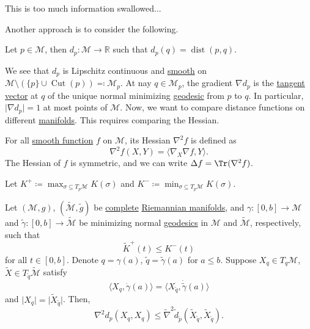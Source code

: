 \begin{note}
	This is too much information swallowed...
\end{note}

Another approach is to consider the following.

\begin{notation}
	Let \(p\in \mathcal{M} \), then \(d_p \colon \mathcal{M} \to \mathbb{R} \) such that \(d_p(q) = \mathop{\mathrm{dist}}(p, q) \).
\end{notation}

We see that \(d_p\) is Lipschitz continuous and \hyperref[def:smooth-function]{smooth} on \(\mathcal{M} \setminus (\{ p \} \cup \mathop{\mathrm{Cut}}(p) ) \eqqcolon \mathcal{M} _p\). At nay \(q\in \mathcal{M} _p\), the gradient \(\nabla d_p\) is the \hyperref[def:tangent-vector]{tangent vector} at \(q\) of the unique normal minimizing \hyperref[def:geodesic]{geodesic} from \(p\) to \(q\). In particular, \(\vert \nabla d_p \vert = 1\) at most points of \(\mathcal{M} \). Now, we want to compare distance functions on different \hyperref[def:smooth-manifold]{manifolds}. This requires comparing the Hessian.

\begin{prev}[Hessian]
	For all \hyperref[def:smooth-function]{smooth function} \(f\) on \(\mathcal{M} \), its Hessian \(\nabla ^2 f\) is defined as
	\[
		\nabla ^2 f(X, Y) = \langle \nabla _X \nabla f, Y \rangle.
	\]
	The Hessian of \(f\) is symmetric, and we can write \(\Delta f = \Tr (\nabla ^2 f)\).
\end{prev}

\begin{notation}
	Let \(K^+ \coloneqq \max _{\sigma \subseteq T_p \mathcal{M} } K(\sigma )\) and \(K^- \coloneqq \min _{\sigma \subseteq T_p \mathcal{M} } K(\sigma )\).
\end{notation}

\begin{theorem}\label{thm:comparsion-Hessian}
	Let \((\mathcal{M} , g)\), \((\widetilde{\mathcal{M}} , \widetilde{g} )\) be \hyperref[def:geodesically-complete]{complete} \hyperref[def:Riemannian-manifold]{Riemannian manifolds}, and \(\gamma \colon [0, b] \to \mathcal{M} \) and \(\widetilde{\gamma} \colon [0, b] \to \widetilde{\mathcal{M}} \) be minimizing normal \hyperref[def:geodesic]{geodesics} in \(\mathcal{M} \) and \(\widetilde{\mathcal{M}} \), respectively, such that
	\[
		\widetilde{K} ^+ (t)\leq K^-(t)
	\]
	for all \(t\in [0, b]\). Denote \(q = \gamma (a)\), \(\widetilde{q} = \widetilde{\gamma} (a)\) for \(a \leq b\). Suppose \(X_q\in T_q \mathcal{M}\), \(\widetilde{X} \in T_{\widetilde{q} } \widetilde{\mathcal{M}} \) satisfy
	\[
		\langle X_q, \dot{\gamma } (a) \rangle = \langle X_{\widetilde{q} }, \dot{\widetilde{\gamma} } (a) \rangle
	\]
	and \(\vert X_q \vert = \vert \widetilde{X} _{\widetilde{q} } \vert \). Then,
	\[
		\nabla ^2 d_p(X_q, X_q) \leq \widetilde{\nabla} ^2 \widetilde{d} _{\widetilde{p} } (\widetilde{X} _{\widetilde{q} }, \widetilde{X} _{\widetilde{q} }).
	\]
\end{theorem}

